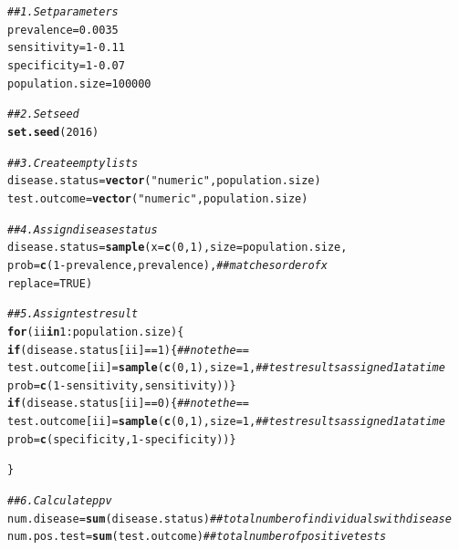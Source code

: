 \documentclass{report}\usepackage[]{graphicx}\usepackage[]{color}
\makeatletter
\newcommand{\hlnum}[1]{\textcolor[rgb]{0.686,0.059,0.569}{#1}}%
\newcommand{\hlstr}[1]{\textcolor[rgb]{0.192,0.494,0.8}{#1}}%
\newcommand{\hlcom}[1]{\textcolor[rgb]{0.678,0.584,0.686}{\textit{#1}}}%
\newcommand{\hlopt}[1]{\textcolor[rgb]{0,0,0}{#1}}%
\newcommand{\hlstd}[1]{\textcolor[rgb]{0.345,0.345,0.345}{#1}}%
\newcommand{\hlkwa}[1]{\textcolor[rgb]{0.161,0.373,0.58}{\textbf{#1}}}%
\newcommand{\hlkwb}[1]{\textcolor[rgb]{0.69,0.353,0.396}{#1}}%
\newcommand{\hlkwc}[1]{\textcolor[rgb]{0.333,0.667,0.333}{#1}}%
\newcommand{\hlkwd}[1]{\textcolor[rgb]{0.737,0.353,0.396}{\textbf{#1}}}%
\newenvironment{kframe}{%
 \def\at@end@of@kframe{}%
 \ifinner\ifhmode%
  \def\at@end@of@kframe{\end{minipage}}%
  \begin{minipage}{\columnwidth}%
 \fi\fi%
 \def\FrameCommand##1{\hskip\@totalleftmargin \hskip-\fboxsep
 \colorbox{shadecolor}{##1}\hskip-\fboxsep
     \hskip-\linewidth \hskip-\@totalleftmargin \hskip\columnwidth}%
 \MakeFramed {\advance\hsize-\width
   \@totalleftmargin\z@ \linewidth\hsize
   \@setminipage}}%
 {\par\unskip\endMakeFramed%
 \at@end@of@kframe}
\newenvironment{knitrout}{}{} %
\makeatother
\begin{document}
\begin{knitrout}
\color{fgcolor}\begin{kframe}
\begin{alltt}
\hlcom{## 1. Set parameters}
\hlstd{prevalence} \hlkwb{=} \hlnum{0.0035}
\hlstd{sensitivity} \hlkwb{=} \hlnum{1} \hlopt{-} \hlnum{0.11}
\hlstd{specificity} \hlkwb{=} \hlnum{1} \hlopt{-} \hlnum{0.07}
\hlstd{population.size} \hlkwb{=} \hlnum{100000}

\hlcom{## 2. Set seed}
\hlkwd{set.seed}\hlstd{(}\hlnum{2016}\hlstd{)}

\hlcom{## 3. Create empty lists}
\hlstd{disease.status} \hlkwb{=} \hlkwd{vector}\hlstd{(}\hlstr{"numeric"}\hlstd{, population.size)}
\hlstd{test.outcome} \hlkwb{=} \hlkwd{vector}\hlstd{(}\hlstr{"numeric"}\hlstd{, population.size)}

\hlcom{## 4. Assign disease status}
\hlstd{disease.status} \hlkwb{=} \hlkwd{sample}\hlstd{(}\hlkwc{x} \hlstd{=} \hlkwd{c}\hlstd{(}\hlnum{0}\hlstd{,}\hlnum{1}\hlstd{),} \hlkwc{size} \hlstd{= population.size,}
                        \hlkwc{prob} \hlstd{=} \hlkwd{c}\hlstd{(}\hlnum{1} \hlopt{-} \hlstd{prevalence, prevalence),}  \hlcom{## matches order of x}
                        \hlkwc{replace} \hlstd{=} \hlnum{TRUE}\hlstd{)}

\hlcom{## 5. Assign test result}
\hlkwa{for} \hlstd{(ii} \hlkwa{in} \hlnum{1}\hlopt{:}\hlstd{population.size) \{}
  \hlkwa{if} \hlstd{(disease.status[ii]} \hlopt{==} \hlnum{1}\hlstd{) \{}  \hlcom{## note the ==}
    \hlstd{test.outcome[ii]} \hlkwb{=} \hlkwd{sample}\hlstd{(}\hlkwd{c}\hlstd{(}\hlnum{0}\hlstd{,} \hlnum{1}\hlstd{),} \hlkwc{size} \hlstd{=} \hlnum{1}\hlstd{,} \hlcom{## test results assigned 1 at a time}
                              \hlkwc{prob} \hlstd{=} \hlkwd{c}\hlstd{(}\hlnum{1} \hlopt{-} \hlstd{sensitivity, sensitivity))\}}
  \hlkwa{if} \hlstd{(disease.status[ii]} \hlopt{==} \hlnum{0}\hlstd{) \{}  \hlcom{## note the ==}
    \hlstd{test.outcome[ii]} \hlkwb{=} \hlkwd{sample}\hlstd{(}\hlkwd{c}\hlstd{(}\hlnum{0}\hlstd{,} \hlnum{1}\hlstd{),} \hlkwc{size} \hlstd{=} \hlnum{1}\hlstd{,} \hlcom{## test results assigned 1 at a time}
                              \hlkwc{prob} \hlstd{=} \hlkwd{c}\hlstd{(specificity,} \hlnum{1} \hlopt{-} \hlstd{specificity))\}}

\hlstd{\}}

\hlcom{## 6. Calculate ppv}
\hlstd{num.disease} \hlkwb{=} \hlkwd{sum}\hlstd{(disease.status)}  \hlcom{## total number of individuals with disease}
\hlstd{num.pos.test} \hlkwb{=} \hlkwd{sum}\hlstd{(test.outcome)}   \hlcom{## total number of positive tests}


\end{alltt}
\end{kframe}
\end{knitrout}
\end{document}
